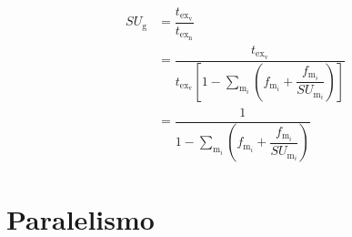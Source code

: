 \begin{equation}
  \label{eq:performance-global_speedup_extended}
  \begin{split}
    SU_{\text{g}} & = 
\dfrac{ t_{\text{ex}_{\text{v}}} } { 
t_{\text{ex}_\text{n}} }\\
  & = \dfrac{ t_{\text{ex}_{\text{v}}} } { 
t_{\text{ex}_{\text{v}}} \left[ 1 - \sum \limits_{\text{m}_{i}} 
\left( f_{\text{m}_{i}} + \dfrac{ f_{\text{m}_{i}} } { 
SU_{\text{m}_{i}} } \right) \right] }\\
  & = \dfrac{ 1 } { 1 - \sum \limits_{\text{m}_{i}} \left(
f_{\text{m}_{i}} + \dfrac{ f_{\text{m}_{i}} } { SU_{\text{m}_{i}} 
} \right) }
  \end{split}
\end{equation}

\section{Paralelismo}
\label{sec:parallelism}

